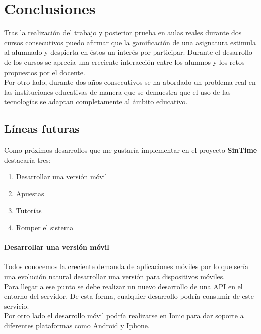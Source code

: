 \setcounter{chapter}{9}
\setcounter{section}{0}
\setcounter{subsection}{0}
\chapter{Conclusiones}

Tras la realización del trabajo y posterior prueba en aulas reales durante dos cursos consecutivos puedo afirmar que la gamificación de una asignatura estimula al alumnado y despierta en éstos un interés por participar. Durante el desarrollo de los cursos se aprecia una creciente interacción entre los alumnos y los retos propuestos por el docente.\\

Por otro lado, durante dos años consecutivos se ha abordado un problema real en las instituciones educativas de manera que se demuestra que el uso de las tecnologías se adaptan completamente al ámbito educativo.

\section{Líneas futuras}

Como próximos desarrollos que me gustaría implementar en el proyecto \textbf{SinTime} destacaría tres:

\begin{enumerate}
	\item Desarrollar una versión móvil
	\item Apuestas
	\item Tutorías
	\item Romper el sistema
\end{enumerate}

\subsubsection{Desarrollar una versión móvil}

Todos conocemos la creciente demanda de aplicaciones móviles por lo que sería una evolución natural desarrollar una versión para dispositivos móviles.\\

Para llegar a ese punto se debe realizar un nuevo desarrollo de una API en el entorno del servidor. De esta forma, cualquier desarrollo podría consumir de este servicio.\\

Por otro lado el desarrollo móvil podría realizarse en Ionic para dar soporte a diferentes plataformas como Android y Iphone.

